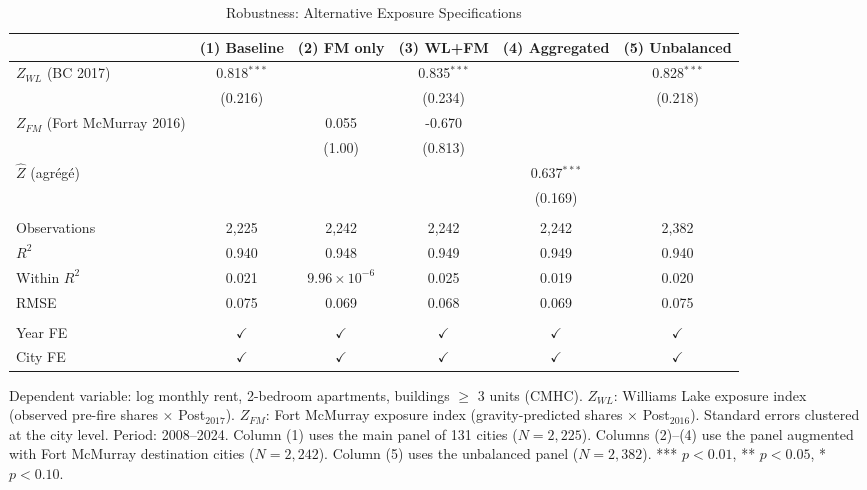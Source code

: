 \begin{table}[htbp]
   \caption{\label{tab:robustness_instrument} Robustness: Alternative Exposure Specifications}
   \bigskip
   \centering
   \begin{tabular}{lccccc}
      \toprule
                                    & (1) Baseline & (2) FM only & (3) WL+FM & (4) Aggregated & (5) Unbalanced \\  
      \midrule 
      $Z_{WL}$ (BC 2017)            & 0.818$^{***}$ &                       & 0.835$^{***}$ &               & 0.828$^{***}$\\   
                                    & (0.216)       &                       & (0.234)       &               & (0.218)\\   
      $Z_{FM}$ (Fort McMurray 2016) &               & 0.055                 & -0.670        &               &   \\   
                                    &               & (1.00)                & (0.813)       &               &   \\   
      $\hat{Z}$ (agrégé)            &               &                       &               & 0.637$^{***}$ &   \\   
                                    &               &                       &               & (0.169)       &   \\   
       \\
      Observations                  & 2,225         & 2,242                 & 2,242         & 2,242         & 2,382\\  
      $R^2$                         & 0.940         & 0.948                 & 0.949         & 0.949         & 0.940\\  
      Within $R^2$                  & 0.021         & $9.96\times 10^{-6}$  & 0.025         & 0.019         & 0.020\\  
      RMSE                          & 0.075         & 0.069                 & 0.068         & 0.069         & 0.075\\  
       \\
      Year FE                       & $\checkmark$  & $\checkmark$          & $\checkmark$  & $\checkmark$  & $\checkmark$\\   
      City FE                       & $\checkmark$  & $\checkmark$          & $\checkmark$  & $\checkmark$  & $\checkmark$\\   
      \bottomrule
   \end{tabular}
   
   \par \raggedright 
   Dependent variable: log monthly rent, 2-bedroom apartments, buildings $\geq$ 3 units (CMHC). $Z_{WL}$: Williams Lake exposure index (observed pre-fire shares $\times$ Post$_{2017}$). $Z_{FM}$: Fort McMurray exposure index (gravity-predicted shares $\times$ Post$_{2016}$). Standard errors clustered at the city level. Period: 2008--2024. Column (1) uses the main panel of 131 cities ($N=2{,}225$). Columns (2)--(4) use the panel augmented with Fort McMurray destination cities ($N=2{,}242$). Column (5) uses the unbalanced panel ($N=2{,}382$). *** $p<0.01$, ** $p<0.05$, * $p<0.10$.
\end{table}
